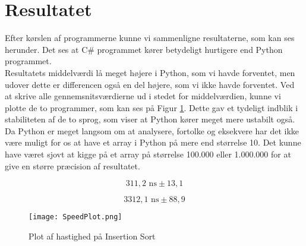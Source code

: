 \documentclass[class=report, crop=false]{standalone}
\begin{document}
    \section{Resultatet}
    Efter kørslen af programmerne kunne vi sammenligne resultaterne, som kan ses herunder. Det ses at C\# programmet kører betydeligt hurtigere end Python programmet.\\
    Resultatets middelværdi lå meget højere i Python, som vi havde forventet, men udover dette er differencen også en del højere, som vi ikke havde forventet. Ved at skrive alle gennemsnitsværdierne ud i stedet for middelværdien, kunne vi plotte de to programmer, som kan ses på Figur \ref{fig:SpeedPlot}. Dette gav et tydeligt indblik i stabiliteten af de to sprog, som viser at Python kører meget mere ustabilt også.
    Da Python er meget langsom om at analysere, fortolke og eksekvere har det ikke være muligt for os at have et array i Python på mere end størrelse 10. Det kunne have været sjovt at kigge på et array på størrelse 100.000 eller 1.000.000 for at give en større præcision af resultatet.
    \begin{tcolorbox}
         \[ 311,2 \text{ ns} \pm 13,1  \]
    \end{tcolorbox}
    \begin{tcolorbox}
         \[ 3312,1 \text{ ns} \pm 88,9  \]
    \end{tcolorbox}

    \begin{tcolorbox}
        \begin{figure}[H]
            \centering
            \texttt{[image: SpeedPlot.png]}
            \caption{Plot af hastighed på Insertion Sort}
            \label{fig:SpeedPlot}
        \end{figure}
    \end{tcolorbox}
\end{document}
